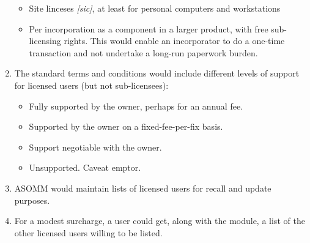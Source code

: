 \documentclass[12pt]{article}
\begin{document}
\begin{enumerate}
\begin{itemize}
        \item Site linceses \emph{[sic]}, at least for personal computers and
            workstations
        \item Per incorporation as a component in a larger product, with free
            sub-licensing rights. This would enable an incorporator to do a
            one-time transaction and not undertake a long-run paperwork burden.
\end{itemize}
    \item The standard terms and conditions would include different levels of
        support for licensed users (but not sub-licensees):
\begin{itemize}
        \item Fully supported by the owner, perhaps for an annual fee.
        \item Supported by the owner on a fixed-fee-per-fix basis.
        \item Support negotiable with the owner.
        \item Unsupported. Caveat emptor.
\end{itemize}
    \item ASOMM would maintain lists of licensed users for recall and update
        purposes.
    \item For a modest surcharge, a user could get, along with the module, a
        list of the other licensed users willing to be listed.
\end{enumerate}
\end{document}
